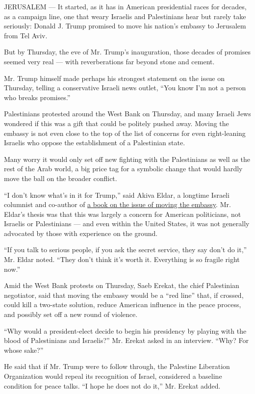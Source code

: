 JERUSALEM --- It started, as it has in American presidential races for
decades, as a campaign line, one that weary Israelis and Palestinians
hear but rarely take seriously: Donald J. Trump promised to move his
nation's embassy to Jerusalem from Tel Aviv.

But by Thursday, the eve of Mr. Trump's inauguration, those decades of
promises seemed very real --- with reverberations far beyond stone and
cement.

Mr. Trump himself made perhaps his strongest statement on the issue on
Thursday, telling a conservative Israeli news outlet, ``You know I'm not
a person who breaks promises.''

Palestinians protested around the West Bank on Thursday, and many
Israeli Jews wondered if this was a gift that could be politely pushed
away. Moving the embassy is not even close to the top of the list of
concerns for even right-leaning Israelis who oppose the establishment of
a Palestinian state.

Many worry it would only set off new fighting with the Palestinians as
well as the rest of the Arab world, a big price tag for a symbolic
change that would hardly move the ball on the broader conflict.

``I don't know what's in it for Trump,'' said Akiva Eldar, a longtime
Israeli columnist and co-author of
\href{http://www.haaretz.com/jewish/books/the-jerusalem-hijack-1.96576}{a
book on the issue of moving the embassy}. Mr. Eldar's thesis was that
this was largely a concern for American politicians, not Israelis or
Palestinians --- and even within the United States, it was not generally
advocated by those with experience on the ground.

``If you talk to serious people, if you ask the secret service, they say
don't do it,'' Mr. Eldar noted. ``They don't think it's worth it.
Everything is so fragile right now.''

Amid the West Bank protests on Thursday, Saeb Erekat, the chief
Palestinian negotiator, said that moving the embassy would be a ``red
line'' that, if crossed, could kill a two-state solution, reduce
American influence in the peace process, and possibly set off a new
round of violence.

``Why would a president-elect decide to begin his presidency by playing
with the blood of Palestinians and Israelis?'' Mr. Erekat asked in an
interview. ``Why? For whose sake?''

He said that if Mr. Trump were to follow through, the Palestine
Liberation Organization would repeal its recognition of Israel,
considered a baseline condition for peace talks. ``I hope he does not do
it,'' Mr. Erekat added.

